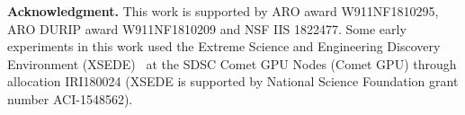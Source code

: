 \documentclass[10pt,twocolumn,letterpaper]{article}
\begin{document}
\noindent\textbf{Acknowledgment.} This work is supported by ARO award W911NF1810295, ARO DURIP award W911NF1810209 and NSF IIS 1822477. Some early experiments in this work used the Extreme Science and Engineering Discovery Environment (XSEDE)~\cite{XSEDE} at the SDSC Comet GPU Nodes (Comet GPU) through allocation IRI180024 (XSEDE is supported by National Science Foundation grant number ACI-1548562).


{\small


}
\end{document}

